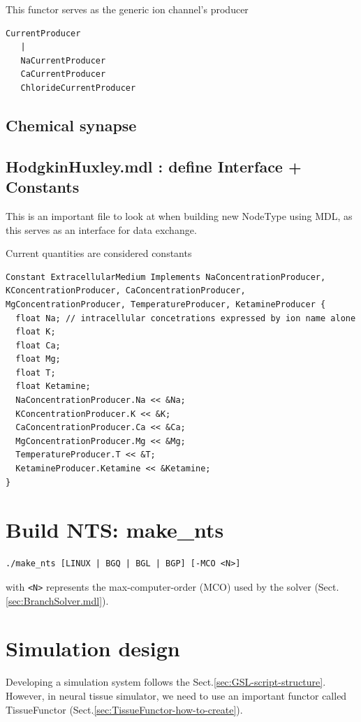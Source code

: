This functor serves as the generic ion channel's producer
\begin{verbatim}
CurrentProducer
   |
   NaCurrentProducer
   CaCurrentProducer
   ChlorideCurrentProducer
\end{verbatim}


\subsection{Chemical synapse}



\subsection{HodgkinHuxley.mdl : define Interface + Constants}

This is an important file to look at when building new NodeType using MDL, as
this serves as an interface for data exchange.

Current quantities are considered constants
\begin{verbatim}
Constant ExtracellularMedium Implements NaConcentrationProducer, KConcentrationProducer, CaConcentrationProducer, MgConcentrationProducer, TemperatureProducer, KetamineProducer {
  float Na; // intracellular concetrations expressed by ion name alone
  float K;
  float Ca;
  float Mg;
  float T;
  float Ketamine;
  NaConcentrationProducer.Na << &Na;
  KConcentrationProducer.K << &K;
  CaConcentrationProducer.Ca << &Ca;
  MgConcentrationProducer.Mg << &Mg;
  TemperatureProducer.T << &T;
  KetamineProducer.Ketamine << &Ketamine;
}
\end{verbatim}



\section{Build NTS: make\_nts}


\begin{verbatim}
./make_nts [LINUX | BGQ | BGL | BGP] [-MCO <N>]
\end{verbatim}
with \verb!<N>! represents the max-computer-order (MCO) used by the solver
(Sect.\ref{sec:BranchSolver.mdl}).

\section{Simulation design}
\label{sec:NTS_simulation}

Developing a simulation system follows the Sect.\ref{sec:GSL-script-structure}.
However, in neural tissue simulator, we need to use an important functor called
TissueFunctor (Sect.\ref{sec:TissueFunctor-how-to-create}).

